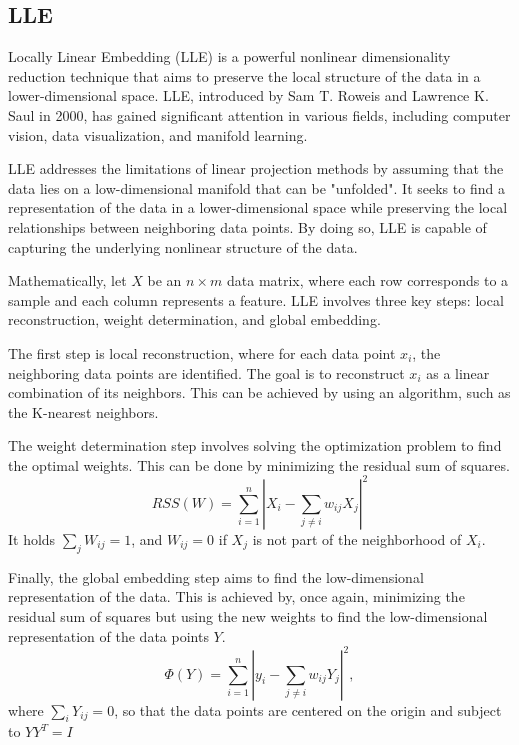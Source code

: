 \subsection{LLE} %
Locally Linear Embedding (LLE) is a powerful nonlinear dimensionality reduction technique that aims to preserve the local structure of the data in a lower-dimensional space. LLE, introduced by Sam T. Roweis and Lawrence K. Saul in 2000, has gained significant attention in various fields, including computer vision, data visualization, and manifold learning.

LLE addresses the limitations of linear projection methods by assuming that the data lies on a low-dimensional manifold that can be "unfolded". It seeks to find a representation of the data in a lower-dimensional space while preserving the local relationships between neighboring data points. By doing so, LLE is capable of capturing the underlying nonlinear structure of the data.

Mathematically, let $X$ be an $n \times m$ data matrix, where each row corresponds to a sample and each column represents a feature. LLE involves three key steps: local reconstruction, weight determination, and global embedding.

The first step is local reconstruction, where for each data point $x_i$, the neighboring data points are identified. The goal is to reconstruct $x_i$ as a linear combination of its neighbors. This can be achieved by using an algorithm, such as the K-nearest neighbors.

The weight determination step involves solving the optimization problem to find the optimal weights. This can be done by minimizing the residual sum of squares.
\begin{equation}
    RSS(W) = \sum^n_{i=1} |X_i - \sum_{j \neq i} w_{ij} X_j|^2
\end{equation}
It holds $\sum_j W_{ij} = 1$, and $W_{ij} = 0$ if $X_j$ is not part of the neighborhood of $X_i$.

Finally, the global embedding step aims to find the low-dimensional representation of the data. This is achieved by, once again, minimizing the residual sum of squares but using the new weights to find the low-dimensional representation of the data points $Y$.
\begin{equation}
    \Phi(Y) = \sum^n_{i=1} |y_i - \sum_{j\neq i}w_{ij}Y_j|^2,
\end{equation}
where $\sum_i Y_{ij} = 0$, so that the data points are centered on the origin and subject to $Y Y^T = I$


